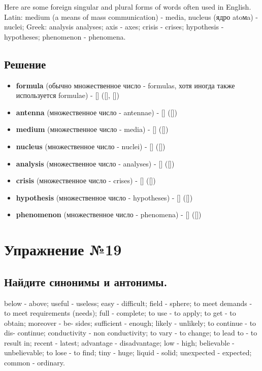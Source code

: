 Here are some foreign singular and plural forms of words often
used in English. Latin: medium (a means of mass communication)
- media, nucleus (ядро atoмa) - nuclei; Greek: analysis
analyses; axis - axes; crisis - crises; hypothesis - hypotheses;
phenomenon - phenomena.

\subsection*{Решение}
\begin{itemize}
      \item \textbf{formula} (обычно множественное число - formulas, хотя иногда также используется formulae) - [] ([], [])
      \item \textbf{antenna} (множественное число - antennae) - [] ([])
      \item \textbf{medium} (множественное число - media) - [] ([])
      \item \textbf{nucleus} (множественное число - nuclei) - [] ([])
      \item \textbf{analysis} (множественное число - analyses) - [] ([])
      \item \textbf{crisis} (множественное число - crises) - [] ([])
      \item \textbf{hypothesis} (множественное число - hypotheses) - [] ([])
      \item \textbf{phenomenon} (множественное число - phenomena) - [] ([])
\end{itemize}

\section{Упражнение №19}
\subsection*{Найдите синонимы и антонимы.}
below - above; useful - useless; easy - difficult; field -
sphere; to meet demands - to meet requirements (needs); full -
complete; to use - to apply; to get - to obtain; moreover - be-
sides; sufficient - enough; likely - unlikely; to continue - to dis-
continue; conductivity - non conductivity; to vary - to change; to
lead to - to result in; recent - latest; advantage - disadvantage;
low - high; believable - unbelievable; to lose - to find; tiny -
huge; liquid - solid; unexpected - expected; common - ordinary.

